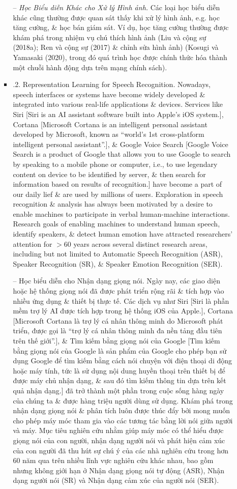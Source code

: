 \documentclass{article}
\begin{document}
\begin{itemize}
\begin{itemize}
\begin{itemize}
            -- {\it Học Biểu diễn Khác cho Xử lý Hình ảnh.} Các loại học biểu diễn khác cũng thường được quan sát thấy khi xử lý hình ảnh, e.g. học tăng cường, \& học bán giám sát. Ví dụ, học tăng cường thường được khám phá trong nhiệm vụ chú thích hình ảnh (Liu và cộng sự (2018a); Ren và cộng sự (2017) \& chỉnh sửa hình ảnh) (Kosugi và Yamasaki (2020), trong đó quá trình học được chính thức hóa thành một chuỗi hành động dựa trên mạng chính sách).
            \item {.2. Representation Learning for Speech Recognition.} Nowadays, speech interfaces or systems have become widely developed \& integrated into various real-life applications \& devices. Services like Siri [Siri is an AI assistant software built into Apple's iOS system.], Cortana [Microsoft Cortana is an intelligent personal assistant developed by Microsoft, known as ``world's 1st cross-platform intelligent personal assistant''.], \& Google Voice Search [Google Voice Search is a product of Google that allows you to use Google to search by speaking to a mobile phone or computer, i.e., to use legendary content on device to be identified by server, \& then search for information based on results of recognition.] have become a part of our daily lief \& are used by millions of users. Exploration in speech recognition \& analysis has always been motivated by a desire to enable machines to participate in verbal human-machine interactions. Research goals of enabling machines to understand human speech, identify speakers, \& detect human emotion have attracted researchers' attention for $> 60$ years across several distinct research areas, including but not limited to Automatic Speech Recognition (ASR), Speaker Recognition (SR), \& Speaker Emotion Recognition (SER).

            -- {\sf Học biểu diễn cho Nhận dạng giọng nói.} Ngày nay, các giao diện hoặc hệ thống giọng nói đã được phát triển rộng rãi \& tích hợp vào nhiều ứng dụng \& thiết bị thực tế. Các dịch vụ như Siri [Siri là phần mềm trợ lý AI được tích hợp trong hệ thống iOS của Apple.], Cortana [Microsoft Cortana là trợ lý cá nhân thông minh do Microsoft phát triển, được gọi là ``trợ lý cá nhân thông minh đa nền tảng đầu tiên trên thế giới''.], \& Tìm kiếm bằng giọng nói của Google [Tìm kiếm bằng giọng nói của Google là sản phẩm của Google cho phép bạn sử dụng Google để tìm kiếm bằng cách nói chuyện với điện thoại di động hoặc máy tính, tức là sử dụng nội dung huyền thoại trên thiết bị để được máy chủ nhận dạng, \& sau đó tìm kiếm thông tin dựa trên kết quả nhận dạng.] đã trở thành một phần trong cuộc sống hàng ngày của chúng ta \& được hàng triệu người dùng sử dụng. Khám phá trong nhận dạng giọng nói \& phân tích luôn được thúc đẩy bởi mong muốn cho phép máy móc tham gia vào các tương tác bằng lời nói giữa người và máy. Mục tiêu nghiên cứu nhằm giúp máy móc có thể hiểu được giọng nói của con người, nhận dạng người nói và phát hiện cảm xúc của con người đã thu hút sự chú ý của các nhà nghiên cứu trong hơn 60 năm qua trên nhiều lĩnh vực nghiên cứu khác nhau, bao gồm nhưng không giới hạn ở Nhận dạng giọng nói tự động (ASR), Nhận dạng người nói (SR) và Nhận dạng cảm xúc của người nói (SER).


\end{itemize}
\end{itemize}
\end{itemize}
\end{document}
